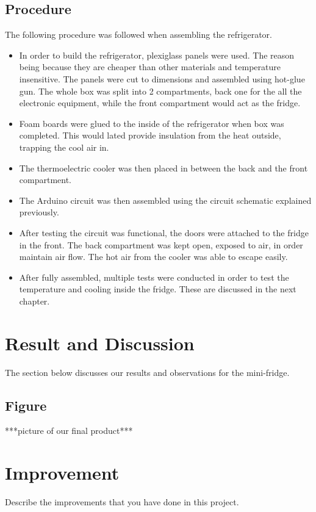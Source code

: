 \documentclass[12pt,a4paper]{report}
\begin{document}
\section{Procedure}
The following procedure was followed when assembling the refrigerator. 
\begin{itemize}\itemsep -2pt
	\item In order to build the refrigerator, plexiglass panels were used. The reason being because they are cheaper than other materials and temperature insensitive. The panels were cut to dimensions and assembled using hot-glue gun. The whole box was split into 2 compartments, back one for the all the electronic equipment, while the front compartment would act as the fridge.
	\item Foam boards were glued to the inside of the refrigerator when box was completed. This would lated provide insulation from the heat outside, trapping the cool air in. 
	\item The thermoelectric cooler was then placed in between the back and the front compartment. 
	\item The Arduino circuit was then assembled using the circuit schematic explained previously. 
	\item After testing the circuit was functional, the doors were attached to the fridge in the front. The back compartment was kept open, exposed to air, in order maintain air flow. The hot air from the cooler was able to escape easily. 
	\item After fully assembled, multiple tests were conducted in order to test the temperature and cooling inside the fridge. These are discussed in the next chapter. 
\end{itemize}

\chapter{Result and Discussion}
The section below discusses our results and observations for the mini-fridge. 

\section{Figure}
 ***picture of our final product***

 






\chapter{Improvement}
Describe the improvements that you have done in this project.
\end{document}

